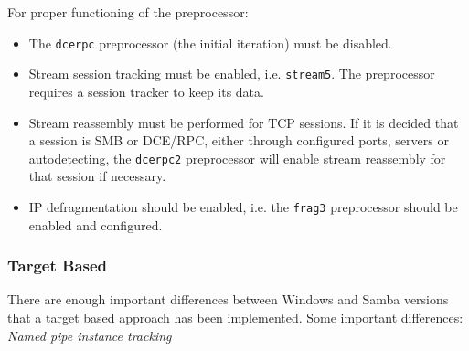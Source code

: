 \documentclass[english]{report}
\begin{document}
For proper functioning of the preprocessor:

\begin{itemize}

\item The \texttt{dcerpc} preprocessor (the initial iteration) must be
disabled.

\item Stream session tracking must be enabled, i.e. \texttt{stream5}.  The
preprocessor requires a session tracker to keep its data.

\item Stream reassembly must be performed for TCP sessions. If it is decided
that a session is SMB or DCE/RPC, either through configured ports, servers or
autodetecting, the \texttt{dcerpc2} preprocessor will enable stream reassembly
for that session if necessary.

\item IP defragmentation should be enabled, i.e. the \texttt{frag3}
preprocessor should be enabled and configured.

\end{itemize}

\subsubsection{Target Based}

There are enough important differences between Windows and Samba versions that
a target based approach has been implemented. Some important differences:\\

\textit{Named pipe instance tracking}
\end{document}
